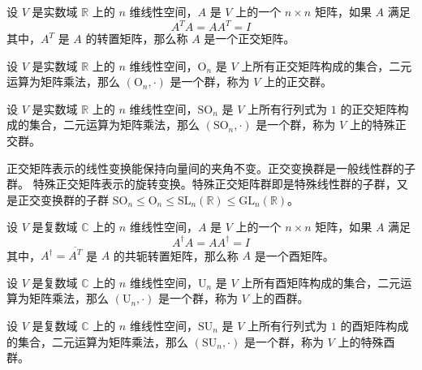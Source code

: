 \vspace{0.5em}

\begin{definition}
    设 $V$ 是实数域 $\mathbb{R}$ 上的 $n$ 维线性空间，$A$ 是 $V$ 上的一个 $n\times n$ 矩阵，如果 $A$ 满足
    \[
        A^T A = A A^T = I
    \]
    其中，$A^T$ 是 $A$ 的转置矩阵，那么称 $A$ 是一个正交矩阵。
\end{definition}

\begin{definition}
    设 $V$ 是实数域 $\mathbb{R}$ 上的 $n$ 维线性空间，$\mathrm{O}_n$ 是 $V$ 上所有正交矩阵构成的集合，二元运算为矩阵乘法，那么 $(\mathrm{O}_n, \cdot)$ 是一个群，称为 $V$ 上的正交群。
\end{definition}

\begin{definition}
    设 $V$ 是实数域 $\mathbb{R}$ 上的 $n$ 维线性空间，$\mathrm{SO}_n$ 是 $V$ 上所有行列式为 $1$ 的正交矩阵构成的集合，二元运算为矩阵乘法，那么 $(\mathrm{SO}_n, \cdot)$ 是一个群，称为 $V$ 上的特殊正交群。
\end{definition}
\begin{note}
    正交矩阵表示的线性变换能保持向量间的夹角不变。正交变换群是一般线性群的子群。
    特殊正交矩阵表示的旋转变换。特殊正交矩阵群即是特殊线性群的子群，又是正交变换群的子群 $\mathrm{SO}_n \leq \mathrm{O}_n \leq \mathrm{SL}_n(\mathbb{R})\leq \mathrm{GL}_n(\mathbb{R})$。
\end{note}
\vspace{0.5em}

\begin{definition}
    设 $V$ 是复数域 $\mathbb{C}$ 上的 $n$ 维线性空间，$A$ 是 $V$ 上的一个 $n\times n$ 矩阵，如果 $A$ 满足
    \[
        A^{\dagger} A = A A^{\dagger} = I
    \]
    其中，$A^{\dagger} = \overline{A^T}$ 是 $A$ 的共轭转置矩阵，那么称 $A$ 是一个酉矩阵。
\end{definition}

\begin{definition}
    设 $V$ 是复数域 $\mathbb{C}$ 上的 $n$ 维线性空间，$\mathrm{U}_n$ 是 $V$ 上所有酉矩阵构成的集合，二元运算为矩阵乘法，那么 $(\mathrm{U}_n, \cdot)$ 是一个群，称为 $V$ 上的酉群。
\end{definition}

\begin{definition}
    设 $V$ 是复数域 $\mathbb{C}$ 上的 $n$ 维线性空间，$\mathrm{SU}_n$ 是 $V$ 上所有行列式为 $1$ 的酉矩阵构成的集合，二元运算为矩阵乘法，那么 $(\mathrm{SU}_n, \cdot)$ 是一个群，称为 $V$ 上的特殊酉群。
\end{definition}

